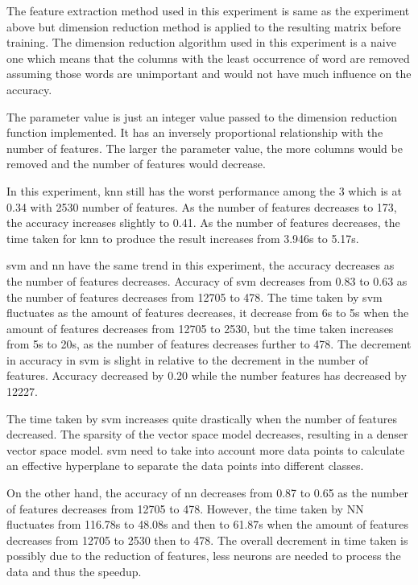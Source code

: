 The feature extraction method used in this experiment is same as the experiment above but dimension reduction method is applied to the resulting matrix before training. The dimension reduction algorithm used in this experiment is a naive one which means that the columns with the least occurrence of word are removed assuming those words are unimportant and would not have much influence on the accuracy.

The parameter value is just an integer value passed to the dimension reduction function implemented. It has an inversely proportional relationship with the number of features. The larger the parameter value, the more columns would be removed and the number of features would decrease.

In this experiment, \ac{knn} still has the worst performance among the 3 which is at 0.34 with 2530 number of features. As the number of features decreases to 173, the accuracy increases slightly to 0.41. As the number of features decreases, the time taken for \ac{knn} to produce the result increases from 3.946s to 5.17s.

\Ac{svm} and \ac{nn} have the same trend in this experiment, the accuracy decreases as the number of features decreases. Accuracy of \ac{svm} decreases from 0.83 to 0.63 as the number of features decreases from 12705 to 478. The time taken by \ac{svm} fluctuates as the amount of features decreases, it decrease from 6s to 5s when the amount of features decreases from 12705 to 2530, but the time taken increases from 5s to 20s, as the number of features decreases further to 478. The decrement in accuracy in \ac{svm} is slight in relative to the decrement in the number of features. Accuracy decreased by 0.20 while the number features has decreased by 12227.

The time taken by \ac{svm} increases quite drastically when the number of features decreased. The sparsity of the vector space model decreases, resulting in a denser vector space model. \Ac{svm} need to take into account more data points to calculate an effective hyperplane to separate the data points into different classes.

On the other hand, the accuracy of \ac{nn} decreases from 0.87 to 0.65 as the number of features decreases from 12705 to 478. However, the time taken by NN fluctuates from 116.78s to 48.08s and then to 61.87s when the amount of features decreases from 12705 to 2530 then to 478. The overall decrement in time taken is possibly due to the reduction of features, less neurons are needed to process the data and thus the speedup.

